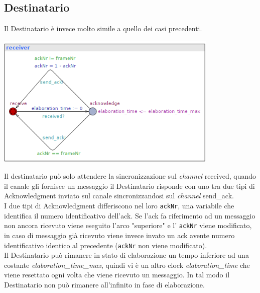 \documentclass[a4paper]{article}
\newcommand{\channel}{\textit{channel }}
\begin{document}
\subsection{Destinatario}
Il Destinatario è invece molto simile a quello dei casi precedenti.
\begin{center}\includegraphics[width=0.8\textwidth]{2_receiver.png}\end{center}
Il destinatario può solo attendere la sincronizzazione sul \channel received, quando il canale gli fornisce un messaggio il Destinatario risponde con uno tra due tipi di Acknowledgment inviato sul canale sincronizzandosi sul \channel send\_ack.\\
I due tipi di Acknowledgment differiscono nel loro \texttt{ackNr}, una variabile che identifica il numero identificativo dell'ack.
Se l'ack fa riferimento ad un messaggio non ancora ricevuto viene eseguito l'arco "superiore" e l' \texttt{ackNr} viene modificato, in caso di messaggio già ricevuto viene invece invato un ack avente numero identificativo identico al precedente (\texttt{ackNr} non viene modificato).\\
Il Destinatario può rimanere in stato di elaborazione un tempo inferiore ad una costante \textit{elaboration\_time\_max}, quindi vi è un altro clock \textit{elaboration\_time} che viene resettato ogni volta che viene ricevuto un messaggio.
In tal modo il Destinatario non può rimanere all'infinito in fase di elaborazione.
\end{document}
